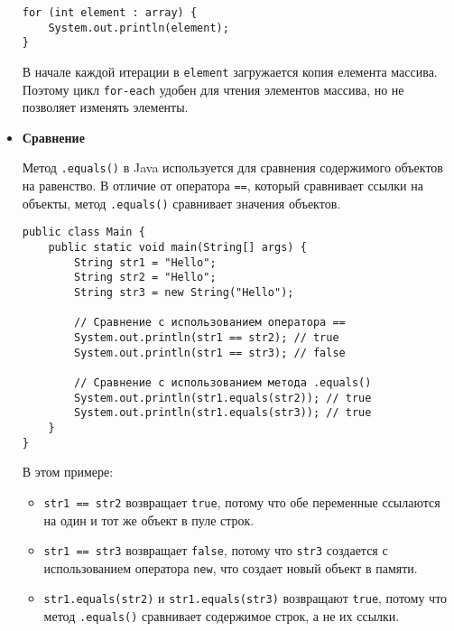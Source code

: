 \begin{itemize}
\begin{verbatim}
for (int element : array) {
    System.out.println(element);
}
    \end{verbatim}
    В начале каждой итерации в \texttt{element} загружается копия елемента массива. Поэтому цикл \texttt{for-each} удобен для чтения элементов массива, но не позволяет изменять элементы.

    \item \textbf{Сравнение}\par
    Метод \texttt{.equals()} в Java используется для сравнения содержимого объектов на равенство. В отличие от оператора \texttt{==}, который сравнивает ссылки на объекты, метод \texttt{.equals()} сравнивает значения объектов.
    \begin{verbatim}
public class Main {
    public static void main(String[] args) {
        String str1 = "Hello";
        String str2 = "Hello";
        String str3 = new String("Hello");

        // Сравнение с использованием оператора ==
        System.out.println(str1 == str2); // true
        System.out.println(str1 == str3); // false

        // Сравнение с использованием метода .equals()
        System.out.println(str1.equals(str2)); // true
        System.out.println(str1.equals(str3)); // true
    }
}
    \end{verbatim}
    В этом примере:
    \begin{itemize}
    \item \texttt{str1 == str2} возвращает \texttt{true}, потому что обе переменные ссылаются на один и тот же объект в пуле строк.\par
    \item \texttt{str1 == str3} возвращает \texttt{false}, потому что \texttt{str3} создается с использованием оператора \texttt{new}, что создает новый объект в памяти.\par
    \item \texttt{str1.equals(str2)} и \texttt{str1.equals(str3)} возвращают \texttt{true}, потому что метод \texttt{.equals()} сравнивает содержимое строк, а не их ссылки.
    \end{itemize}
\end{itemize}

